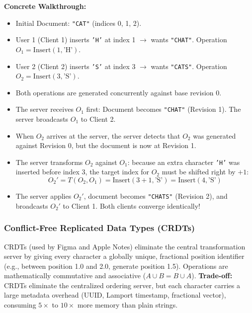 \documentclass[10pt,journal,compsoc,onecolumn]{IEEEtran}
\begin{document}
\textbf{Concrete Walkthrough:}
\begin{itemize}
    \item Initial Document: \texttt{"CAT"} (indices 0, 1, 2).
    \item User 1 (Client 1) inserts \texttt{'H'} at index 1 $\to$ wants \texttt{"CHAT"}. Operation $O_1 = \text{Insert}(1, \text{'H'})$.
    \item User 2 (Client 2) inserts \texttt{'S'} at index 3 $\to$ wants \texttt{"CATS"}. Operation $O_2 = \text{Insert}(3, \text{'S'})$.
    \item Both operations are generated concurrently against base revision 0.
    \item The server receives $O_1$ first: Document becomes \texttt{"CHAT"} (Revision 1). The server broadcasts $O_1$ to Client 2.
    \item When $O_2$ arrives at the server, the server detects that $O_2$ was generated against Revision 0, but the document is now at Revision 1.
    \item The server transforms $O_2$ against $O_1$: because an extra character \texttt{'H'} was inserted before index 3, the target index for $O_2$ must be shifted right by $+1$:
    \begin{equation}
        O_2' = T(O_2, O_1) = \text{Insert}(3 + 1, \text{'S'}) = \text{Insert}(4, \text{'S'})
    \end{equation}
    \item The server applies $O_2'$, document becomes \texttt{"CHATS"} (Revision 2), and broadcasts $O_2'$ to Client 1. Both clients converge identically!
\end{itemize}

\subsubsection{Conflict-Free Replicated Data Types (CRDTs)}
CRDTs (used by Figma and Apple Notes) eliminate the central transformation server by giving every character a globally unique, fractional position identifier (e.g., between position 1.0 and 2.0, generate position 1.5). Operations are mathematically commutative and associative ($A \cup B = B \cup A$).
\textbf{Trade-off:} CRDTs eliminate the centralized ordering server, but each character carries a large metadata overhead (UUID, Lamport timestamp, fractional vector), consuming $5\times$ to $10\times$ more memory than plain strings.
\end{document}
